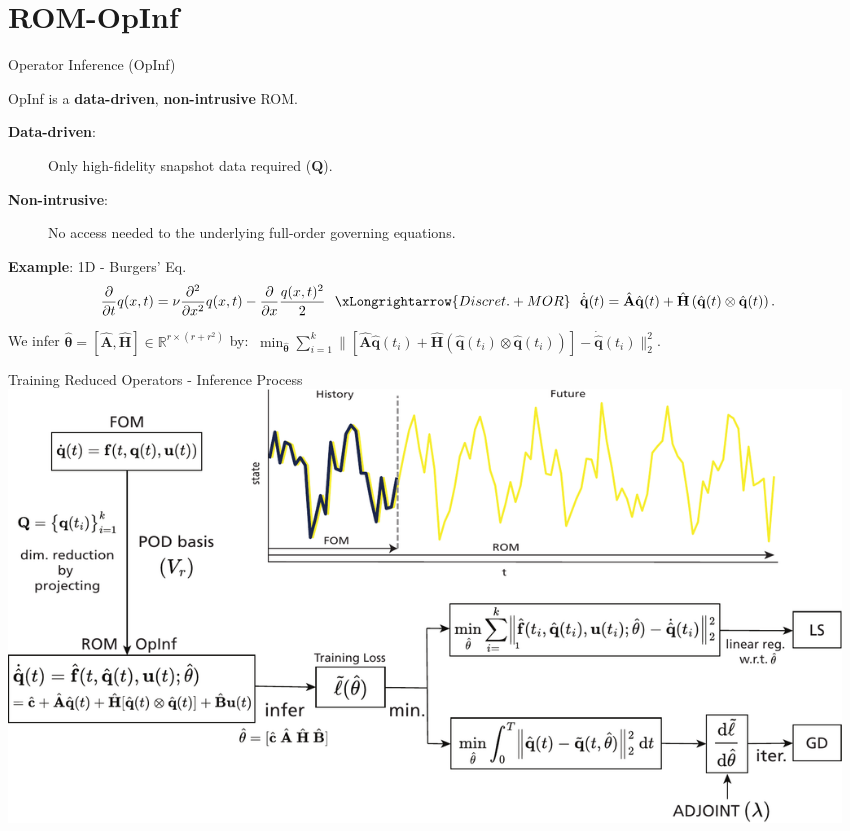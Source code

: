 \section{ROM-OpInf}

\begin{frame}{Operator Inference (OpInf)}
\begin{center}
    OpInf is a \textbf{data-driven}, \textbf{non-intrusive} ROM.
\end{center}

\vspace{0.3cm}

    \begin{description}
    \item[\textbf{Data-driven}:] Only high-fidelity snapshot data required ($\mathbf{Q}$).\vspace{0.1cm}
    \item[\textbf{Non-intrusive}:] No access needed to the underlying full-order governing equations.
    \end{description}

\vspace{0.6cm}

\textbf{Example}: 1D - Burgers' Eq.
$$\dfrac{\partial}{\partial t}q(x,t) = \nu\dfrac{\partial^2 }{\partial x^2}q(x,t) - \dfrac{\partial }{\partial x}\dfrac{q(x,t)^2}{2} ~~ \xLongrightarrow{Discret. + MOR} ~~  \dot{\hat{\mathbf{q}}}(t) = \hat{\mathbf{A}}\hat{\mathbf{q}}(t) + \hat{\mathbf{H}}\left(\hat{\mathbf{q}}(t)\otimes\hat{\mathbf{q}}(t) \right).$$

We infer $\hat{\bm{\theta}}=[\hat{\mathbf{A}},\hat{\mathbf{H}}]\in\mathbb{R}^{r\times(r+r^2)}$ by: $~\displaystyle\min_{\hat{\bm{\theta}}} \sum_{i=1}^k\Bigg\| \left[\hat{\mathbf{A}}\hat{\mathbf{q}}(t_i) + \hat{\mathbf{H}}\left(\hat{\mathbf{q}}(t_i)\otimes\hat{\mathbf{q}}(t_i) \right)\right] - \dot{\hat{\mathbf{q}}}(t_i)\Bigg\|_2^2$.

\end{frame}


\begin{frame}{Training Reduced Operators - Inference Process}
    \vspace{0.2cm}
    \centering
    \includegraphics[width=0.97\textwidth]{images/intro_scheme.pdf} 
\end{frame}